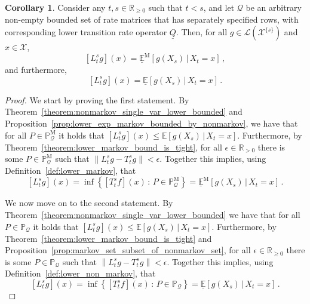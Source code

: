 \documentclass[10pt]{paper}
\theoremstyle{definition}
\newtheorem{corollary}[theorem]{Corollary}
\newcommand{\reals}{\mathbb{R}}
\newcommand{\realspos}{\reals_{>0}}
\newcommand{\realsnonneg}{\reals_{\geq 0}}
\newcommand{\states}{\mathcal{X}}
\newcommand{\processes}{\mathbb{P}}
\newcommand{\mprocesses}{\processes^{\mathrm{M}}}
\newcommand{\gambles}{\mathcal{L}}
\newcommand{\rateset}{\mathcal{Q}}
\newcommand{\lrate}{\underline{Q}}
\newcommand{\norm}[1]{\left\lVert #1 \right\rVert}
\begin{document}
\begin{corollary}\label{cor:lower_operator_is_infimum}
Consider any $t,s\in\realsnonneg$ such that $t<s$, and let $\rateset$ be an arbitrary non-empty bounded set of rate matrices that has separately specified rows, with corresponding lower transition rate operator $\lrate$. Then, for all $g\in\gambles(\states^{\{s\}})$ and $x\in\states$,
\begin{equation*}
\left[L_t^sg\right](x) = \underline{\mathbb{E}}^\mathrm{M}[g(X_s)\,\vert\,X_t=x]\,,%
\end{equation*}
and furthermore,
\begin{equation*}
\left[L_t^sg\right](x) = \underline{\mathbb{E}}[g(X_s)\,\vert\,X_t=x]\,.%
\end{equation*}
\end{corollary}
\begin{proof}
We start by proving the first statement. By Theorem~\ref{theorem:nonmarkov_single_var_lower_bounded} and Proposition~\ref{prop:lower_exp_markov_bounded_by_nonmarkov}, we have that for all $P\in\mprocesses_\rateset$ it holds that $\left[L_t^sg\right](x) \leq \mathbb{E}[g(X_s)\,\vert\,X_t=x]$. Furthermore, by Theorem~\ref{theorem:lower_markov_bound_is_tight}, for all $\epsilon\in\realspos$ there is some $P\in\mprocesses_\rateset$ such that $\norm{L_t^sg - T_t^sg} < \epsilon$. Together this implies, using Definition~\ref{def:lower_markov}, that
\begin{equation*}
\left[L_t^sg\right](x) = \inf\left\{\left[T_t^sf\right](x)\,:\,P\in\mprocesses_\rateset\right\} = \underline{\mathbb{E}}^{\mathrm{M}}\left[g(X_s)\,\vert\,X_t=x\right]\,.
\end{equation*}

We now move on to the second statement. By Theorem~\ref{theorem:nonmarkov_single_var_lower_bounded} we have that for all $P\in\processes_\rateset$ it holds that $\left[L_t^sg\right](x) \leq \mathbb{E}[g(X_s)\,\vert\,X_t=x]$.
Furthermore, by Theorem~\ref{theorem:lower_markov_bound_is_tight} and Proposition~\ref{prop:markov_set_subset_of_nonmarkov_set}, for all $\epsilon\in\realsnonneg$ there is some $P\in\processes_\rateset$ such that
$\norm{L_t^sg - T_t^sg} < \epsilon$.
Together this implies, using Definition~\ref{def:lower_non_markov}, that
\begin{equation*}
\left[L_t^sg\right](x) = \inf\left\{\left[T_t^sf\right](x)\,:\,P\in\processes_\rateset\right\} = \underline{\mathbb{E}}\left[g(X_s)\,\vert\,X_t=x\right]\,.
\end{equation*}
\end{proof}
\end{document}
